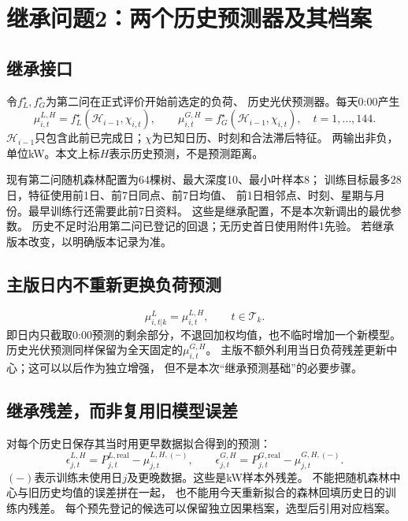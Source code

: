 \documentclass[UTF8,11pt]{ctexart}
\begin{document}
\section{继承问题2：两个历史预测器及其档案}
\subsection{继承接口}
令$f_L^\star,f_G^\star$为第二问在正式评价开始前选定的负荷、
历史光伏预测器。每天0:00产生
\begin{equation}
 \mu^{L,H}_{i,t}=f_L^\star(\mathcal H_{i-1},\chi_{i,t}),\qquad
 \mu^{G,H}_{i,t}=f_G^\star(\mathcal H_{i-1},\chi_{i,t}),
 \quad t=1,\ldots,144.
\end{equation}
$\mathcal H_{i-1}$只包含此前已完成日；$\chi$为已知日历、时刻和合法滞后特征。
两输出非负，单位kW。本文上标$H$表示历史预测，不是预测距离。

现有第二问随机森林配置为64棵树、最大深度10、最小叶样本8；
训练目标最多28日，特征使用前1日、前7日同点、前7日均值、
前1日相邻点、时刻、星期与月份。最早训练行还需要此前7日资料。
这些是继承配置，不是本次新调出的最优参数。
历史不足时沿用第二问已登记的回退；无历史首日使用附件1先验。
若继承版本改变，以明确版本记录为准。

\subsection{主版日内不重新更换负荷预测}
\begin{equation}\label{eq:loadinherit}
 \mu^L_{i,t|k}=\mu^{L,H}_{i,t},\qquad t\in\mathcal T_k.
\end{equation}
即日内只截取0:00预测的剩余部分，不退回加权均值，也不临时增加一个新模型。
历史光伏预测同样保留为全天固定的$\mu^{G,H}_{i,t}$。
主版不额外利用当日负荷残差更新中心；这可以以后作为独立增强，
但不是本次“继承预测基础”的必要步骤。

\subsection{继承残差，而非复用旧模型误差}
对每个历史日保存其当时用更早数据拟合得到的预测：
\begin{equation}
 \epsilon^{L,H}_{j,t}=P^{L,\mathrm{real}}_{j,t}-\mu^{L,H,(-)}_{j,t},
 \qquad
 \epsilon^{G,H}_{j,t}=P^{G,\mathrm{real}}_{j,t}-\mu^{G,H,(-)}_{j,t}.
\end{equation}
$(-)$表示训练未使用日$j$及更晚数据。这些是kW样本外残差。
不能把随机森林中心与旧历史均值的误差拼在一起，
也不能用今天重新拟合的森林回填历史日的训练内残差。
每个预先登记的候选可以保留独立因果档案，选型后引用对应档案。
\end{document}
